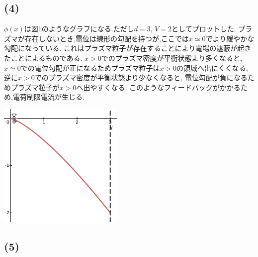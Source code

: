 \documentclass[uplatex,a4j,11pt,dvipdfmx]{jsarticle}
\makeatletter
\def\fgcaption{\def\@captype{figure}\caption}
\makeatother
\begin{document}
\subsection*{(4)}
$\phi(x)$は図1のようなグラフになる.ただし$d=3$, $V=2$としてプロットした.
プラズマが存在しないとき,電位は線形の勾配を持つが,ここでは$x\simeq0$でより緩やかな勾配になっている.
これはプラズマ粒子が存在することにより電場の遮蔽が起きたことによるものである.
$x>0$でのプラズマ密度が平衡状態より多くなると, $x\simeq0$での電位勾配が正になるためプラズマ粒子は$x>0$の領域へ出にくくなる,
逆に$x>0$でのプラズマ密度が平衡状態より少なくなると, 電位勾配が負になるためプラズマ粒子が$x>0$へ出やすくなる.
このようなフィードバックがかかるため,電荷制限電流が生じる.
\begin{center}
  \includegraphics[width=6cm]{x-phi.png}
  \fgcaption{$\phi(x)$のグラフ}
\end{center}
\subsection*{(5)}
\end{document}

